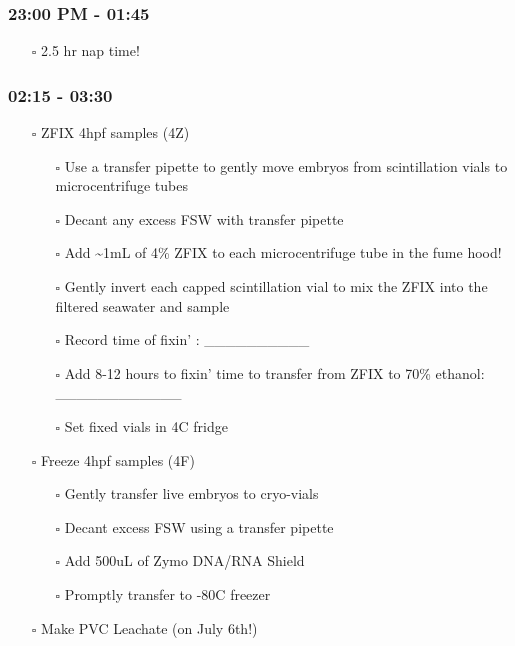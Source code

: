 \documentclass[
  letterpaper,
  DIV=11,
  numbers=noendperiod]{scrartcl}
\providecommand{\tightlist}{%
  \setlength{\itemsep}{0pt}\setlength{\parskip}{0pt}}\usepackage{longtable,booktabs,array}
\begin{document}
\hypertarget{pm---0145}{%
\subsubsection{23:00 PM - 01:45}\label{pm---0145}}

\begin{itemize}
\tightlist
\item[$\square$]
  2.5 hr nap time!
\end{itemize}

\hypertarget{section-6}{%
\subsubsection{02:15 - 03:30}\label{section-6}}

\begin{itemize}
\item[$\square$]
  ZFIX 4hpf samples (4Z)

  \begin{itemize}
  \tightlist
  \item[$\square$]
    Use a transfer pipette to gently move embryos from scintillation
    vials to microcentrifuge tubes
  \item[$\square$]
    Decant any excess FSW with transfer pipette
  \item[$\square$]
    Add \textasciitilde1mL of 4\% ZFIX to each microcentrifuge tube in
    the fume hood!
  \item[$\square$]
    Gently invert each capped scintillation vial to mix the ZFIX into
    the filtered seawater and sample
  \item[$\square$]
    Record time of fixin' : \_\_\_\_\_\_\_\_\_\_
  \item[$\square$]
    Add 8-12 hours to fixin' time to transfer from ZFIX to 70\% ethanol:
    \_\_\_\_\_\_\_\_\_\_\_\_
  \item[$\square$]
    Set fixed vials in 4C fridge
  \end{itemize}
\item[$\square$]
  Freeze 4hpf samples (4F)

  \begin{itemize}
  \item[$\square$]
    Gently transfer live embryos to cryo-vials
  \item[$\square$]
    Decant excess FSW using a transfer pipette
  \item[$\square$]
    Add 500uL of Zymo DNA/RNA Shield
  \item[$\square$]
    Promptly transfer to -80C freezer
  \end{itemize}
\item[$\square$]
  Make PVC Leachate (on July 6th!)
\end{itemize}
\end{document}

